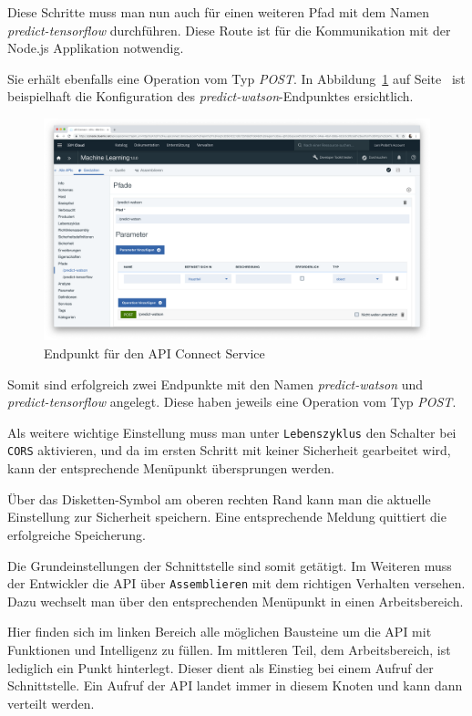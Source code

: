 Diese Schritte muss man nun auch für einen weiteren Pfad mit dem Namen \textit{predict-tensorflow} durchführen. Diese
Route ist für die Kommunikation mit der Node.js Applikation notwendig.

Sie erhält ebenfalls eine Operation vom Typ \textit{POST}. In Abbildung~\ref{fig:umsetzung_apiconnect_endpoint} auf
Seite~\pageref{fig:umsetzung_apiconnect_endpoint} ist beispielhaft die Konfiguration des
\textit{predict-watson}-Endpunktes ersichtlich.

\begin{figure}[h]
    \centering
    \includegraphics[width=\textwidth]{images/kapitel_3/apiconnect_endpoint.png}
    \caption{Endpunkt für den API Connect Service}
    \label{fig:umsetzung_apiconnect_endpoint}
\end{figure}

Somit sind erfolgreich zwei Endpunkte mit den Namen \textit{predict-watson} und \textit{predict-tensorflow} angelegt.
Diese haben jeweils eine Operation vom Typ \textit{POST}.

Als weitere wichtige Einstellung muss man unter \texttt{Lebenszyklus} den Schalter bei \texttt{CORS} aktivieren, und da
im ersten Schritt mit keiner Sicherheit gearbeitet wird, kann der entsprechende Menüpunkt übersprungen werden.

Über das Disketten-Symbol am oberen rechten Rand kann man die aktuelle Einstellung zur Sicherheit speichern. Eine
entsprechende Meldung quittiert die erfolgreiche Speicherung.

Die Grundeinstellungen der Schnittstelle sind somit getätigt. Im Weiteren muss der Entwickler die API über
\texttt{Assemblieren} mit dem richtigen Verhalten versehen. Dazu wechselt man über den entsprechenden Menüpunkt in einen
Arbeitsbereich.

Hier finden sich im linken Bereich alle möglichen Bausteine um die API mit Funktionen und Intelligenz zu füllen. Im
mittleren Teil, dem Arbeitsbereich, ist lediglich ein Punkt hinterlegt. Dieser dient als Einstieg bei einem Aufruf der
Schnittstelle. Ein Aufruf der API landet immer in diesem Knoten und kann dann verteilt werden.


